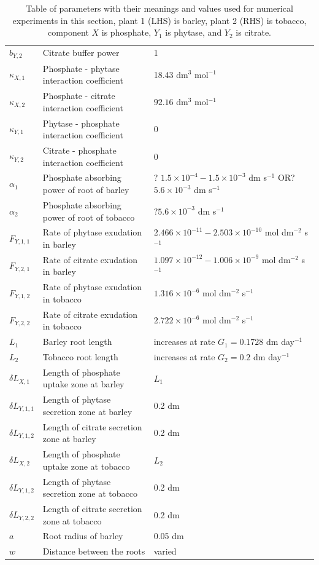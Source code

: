 \documentclass[11pt]{article}
\begin{document}
\begin{table}[!htb]
\begin{center}
\begin{tabular}{lll}
	$b_{Y,2}$ & Citrate buffer power & 1 \\
	$\kappa_{X,1}$ & Phosphate - phytase interaction coefficient & 18.43 dm$^3$ mol$^{-1}$ \\
	$\kappa_{X,2}$ & Phosphate - citrate interaction coefficient & $92.16$ dm$^3$ mol$^{-1}$ \\
	$\kappa_{Y,1}$ & Phytase - phosphate interaction coefficient & 0 \\
	$\kappa_{Y,2}$ & Citrate - phosphate interaction coefficient & 0 \\ 
	$\alpha_1 $ & Phosphate absorbing power of root of barley & ? $1.5 \times 10^{-4} - 1.5 \times 10^{-3} $ dm s$^{-1}$ OR? $5.6 \times 10^{-3}$ dm s$^{-1}$\\
	$\alpha_2 $ & Phosphate absorbing power of root of tobacco & ?$5.6 \times 10^{-3}$ dm s$^{-1}$\\
	$F_{Y,1,1} $ & Rate of phytase exudation in barley & $2.466 \times 10^{-11} - 2.503 \times 10^{-10}$  mol dm$^{-2}$ s$^{-1}$ \\
	$F_{Y,2,1} $ & Rate of citrate exudation in barley & $1.097 \times 10^{-12} - 1.006 \times 10^{-9}$ mol dm$^{-2}$ s$^{-1}$ \\
	$F_{Y,1,2} $ & Rate of phytase exudation in tobacco &  $1.316 \times 10^{-6}$ mol dm$^{-2}$ s$^{-1}$ \\
	$F_{Y,2,2} $ & Rate of citrate exudation in tobacco &  $2.722 \times 10^{-6}$ mol dm$^{-2}$ s$^{-1}$ \\
	$L_1$ & Barley root length & increases at rate $G_1 = 0.1728$ dm day$^{-1}$ \\
	$L_2$ & Tobacco root length & increases at rate $G_2 = 0.2$ dm day$^{-1}$\\
	$\delta L_{X,1}$ & Length of phosphate uptake zone at barley & $L_1$\\
	$\delta L_{Y,1,1}$ & Length of phytase secretion zone at barley & 0.2 dm \\
	$\delta L_{Y,1,2}$ & Length of citrate secretion zone at barley & 0.2 dm\\
	$\delta L_{X,2}$ & Length of phosphate uptake zone at tobacco & $L_2$ \\
	$\delta L_{Y,1,2}$ &  Length of phytase secretion zone at tobacco & 0.2 dm \\
	$\delta L_{Y,2,2}$ &  Length of citrate secretion zone at tobacco & 0.2 dm \\
	$a$ & Root radius of barley & 0.05 dm \\
	$w$ & Distance between the roots & varied \\
\bottomrule

\end{tabular}
\caption{Table of parameters with their meanings and values used for numerical experiments in this section, plant 1 (LHS) is barley, plant 2 (RHS) is tobacco, component $X$ is phosphate, $Y_1$ is phytase, and $Y_2$ is citrate. \label{t:Second-model-params}
}
\end{center}

\end{table}
\end{document}

